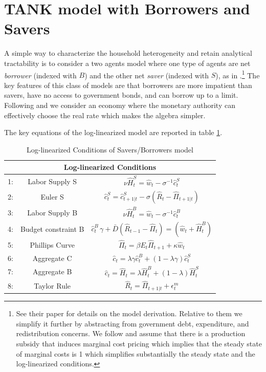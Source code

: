 \documentclass[a4paper,12pt]{article}%
\begin{document}
\clearpage
\section{TANK model with Borrowers and Savers}\label{A:BSmodel}
A simple way to characterize the household heterogeneity and retain analytical tractability is to consider a two agents model where one type of agents are net \emph{borrower} (indexed with $B$) and the  other net \emph{saver} (indexed with $S$), as in \citet{BMP:2013}.\footnote{See their paper for details on the model derivation. Relative to them we simplify it further by abstracting from government debt, expenditure, and redistribution concerns. We follow \citet{Bilbiie:2019} and assume that there is a production subsidy that induces marginal cost pricing which implies that the steady state of marginal costs is 1 which simplifies substantially the steady state and the log-linearized conditions.} The key features of this class of models are that borrowers are more impatient than savers, have no access to government bonds, and can borrow up to a limit. Following \cite{Bilbiie:2019} and \cite{MNS:2016} we consider an economy where the monetary authority can effectively choose the real rate which makes the algebra simpler.

The key equations of the log-linearized model are reported in table \ref{tab:TANKBS_main}.%
\begin{table}[h!]
\begin{center}
\begin{tabular}{ccc}
\hline
\hline
\multicolumn{3}{c}{Log-linearized Conditions}\\
\hline
1: & Labor Supply S & $\nu \hat{H}^S_{t} =\hat{w}_{t}-\sigma^{-1} \hat{c}^S_{t}$ \\
2: & Euler S &  $ \hat{c}_{t}^{S} =\hat{c}_{t+1|t}^{S}-\sigma\left(\hat{R}_{t}-\hat{\Pi}_{t+1|t}\right)$\\
3: & Labor Supply B & $\nu  \hat{H}^B_{t} = \hat{w}_{t}-\sigma^{-1}  \hat{c}^B_{t}$ \\
4: & Budget constraint B & $\hat{c}^B_{t}\, \gamma+{\bar{D}}(\hat{R}_{t-1}-\hat{\Pi}_{t})= \left({\hat{w}}_{t}+\hat{H}^B_{t}\right)$\\
5: & Phillips Curve & $ \hat{\Pi}_{t} =\beta E_{t}  \hat{\Pi}_{t+1}+ \kappa  \hat{w}_{t}$\\
6: & Aggregate C & $ \hat{c}_t=\lambda \gamma  \hat{c}^B_t+(1-\lambda \gamma) \hat{c}^S_t$\\
7: & Aggregate B & $ \hat{c}_t=\hat{H}_t=\lambda  \hat{H}^B_t+(1-\lambda) \hat{H}^S_t$\\
8: & Taylor Rule & $  \hat{R}_{t} = \hat{\Pi}_{t+1|t}+\epsilon^m_{t} $\\
\hline
\hline
\end{tabular}
\end{center}
\caption{Log-linearized Conditions of Savers/Borrowers model}\label{tab:TANKBS_main}
\end{table}
\end{document}
